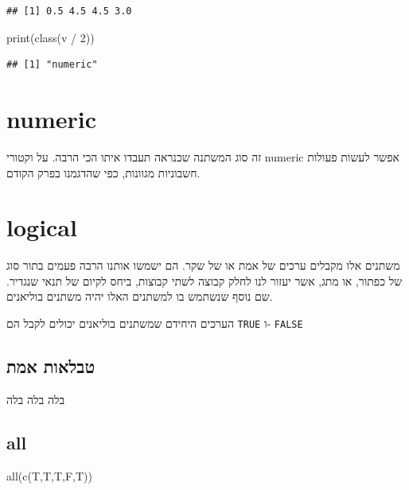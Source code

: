 \documentclass[
]{book}
\newenvironment{Shaded}{\begin{snugshade}}{\end{snugshade}}
\newcommand{\DecValTok}[1]{\textcolor[rgb]{0.00,0.00,0.81}{#1}}
\newcommand{\FunctionTok}[1]{\textcolor[rgb]{0.00,0.00,0.00}{#1}}
\newcommand{\NormalTok}[1]{#1}
\newcommand{\SpecialCharTok}[1]{\textcolor[rgb]{0.00,0.00,0.00}{#1}}
\begin{document}
\begin{verbatim}
## [1] 0.5 4.5 4.5 3.0
\end{verbatim}

\begin{Shaded}
\begin{Highlighting}[]
\FunctionTok{print}\NormalTok{(}\FunctionTok{class}\NormalTok{(v }\SpecialCharTok{/} \DecValTok{2}\NormalTok{))}
\end{Highlighting}
\end{Shaded}

\begin{verbatim}
## [1] "numeric"
\end{verbatim}

\hypertarget{numeric}{%
\section{numeric}\label{numeric}}

זה סוג המשתנה שכנראה תעבדו איתו הכי הרבה. על וקטורי
numeric
אפשר לעשות פעולות חשבוניות מגוונות, כפי שהדגמנו בפרק הקודם.

\hypertarget{logical}{%
\section{logical}\label{logical}}

משתנים אלו מקבלים ערכים של אמת או של שקר. הם ישמשו אותנו הרבה פעמים בתור סוג של כפתור, או מתג, אשר יעזור לנו לחלק קבוצה לשתי קבוצות, ביחס לקיום של תנאי שנגדיר.
שם נוסף שנשתמש בו למשתנים האלו יהיה משתנים בוליאנים.

הערכים היחידם שמשתנים בוליאנים יכולים לקבל הם
\texttt{TRUE}
ו-
\texttt{FALSE}

\hypertarget{ux5d8ux5d1ux5dcux5d0ux5d5ux5ea-ux5d0ux5deux5ea}{%
\subsection{טבלאות אמת}\label{ux5d8ux5d1ux5dcux5d0ux5d5ux5ea-ux5d0ux5deux5ea}}

בלה בלה בלה

\hypertarget{all}{%
\subsection{all}\label{all}}

\begin{Shaded}
\begin{Highlighting}[]
\FunctionTok{all}\NormalTok{(}\FunctionTok{c}\NormalTok{(T,T,T,F,T))}
\end{Highlighting}
\end{Shaded}
\end{document}
